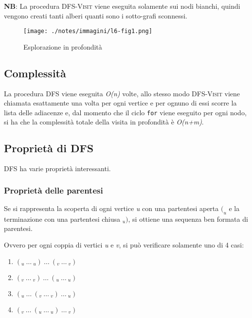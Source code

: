 \textbf{NB}: La procedura \textsc{DFS-Visit} viene eseguita solamente sui nodi
bianchi, quindi vengono creati tanti alberi quanti sono i sotto-grafi
sconnessi.

\begin{figure}[htbp]
	\centering
	\texttt{[image: ./notes/immagini/l6-fig1.png]}
	\caption{Esplorazione in profondità}
\end{figure}

\subsection{Complessità}\label{complessituxe0}

La procedura \textsc{DFS} viene eseguita \emph{O(n)} volte, allo stesso
modo \textsc{DFS-Visit} viene chiamata esattamente una volta per ogni
vertice e per ognuno di essi scorre la lista delle adiacenze e, dal
momento che il ciclo \texttt{for} viene eseguito per ogni nodo, si ha che la
complessità totale della visita in profondità è \emph{O(n+m)}.

\subsection{Proprietà di DFS}\label{proprietuxe0-di-dfs}

DFS ha varie proprietà interessanti.

\subsubsection{Proprietà delle
parentesi}\label{proprietuxe0-delle-parentesi}

Se si rappresenta la scoperta di ogni vertice \emph{u} con una
partentesi aperta $(_u$ e la terminazione con una partentesi chiusa
$_u)$, si ottiene una sequenza ben formata di parentesi.

Ovvero per ogni coppia di vertici \emph{u} e \emph{v}, si può verificare
solamente uno di 4 casi:

\begin{enumerate}
\item
  $(_u \: \ldots\: _u) \: \ldots \: (_v \:\ldots \:_v)$
\item
  $(_v  \: \ldots \: _v) \: \ldots \: (_u \:\ldots \:_u)$
\item
  $(_u \: \ldots \: (_v \: \ldots \:_v) \: \ldots \:_u)$
\item
  $(_v \: \ldots \: (_u \: \ldots \: _u)\: \ldots \:_v)$
\end{enumerate}


